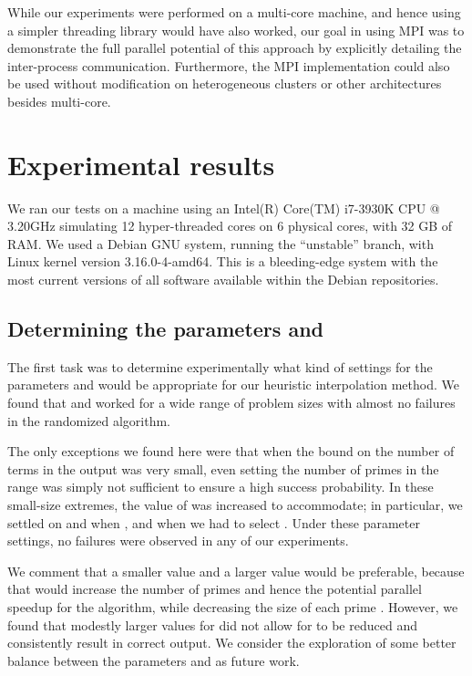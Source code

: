 \documentclass[letterpaper,10pt]{article}
\begin{document}
 While our experiments were performed on a multi-core machine, and hence
 using a simpler threading library would have also worked, our goal in
 using MPI was to demonstrate the full parallel potential of this
 approach by explicitly detailing the inter-process communication.
 Furthermore, the MPI implementation could also be used without
 modification on heterogeneous clusters or other architectures besides
 multi-core.
  
\section{Experimental results}
\label{sec:exper}

We ran our tests on a machine using an Intel(R) Core(TM) i7-3930K CPU @ 3.20GHz 
simulating 12 hyper-threaded cores on 6 physical cores, with 32 GB of RAM. 
We used a Debian GNU system, running the ``unstable'' branch, 
with Linux kernel version 3.16.0-4-amd64. This is a bleeding-edge system
with the most current versions of all software available within the
Debian repositories.

\subsection{Determining the parameters  and }

The first task was to determine experimentally what kind of settings for
the parameters  and  would be appropriate for our heuristic
interpolation method. We found that  and  worked for a
wide range of problem sizes with almost no failures in the randomized
algorithm.

The only exceptions we found here were that when the bound on the number of
terms  in the output was very small, even setting  the number
of primes  in the range  was simply not
sufficient to ensure a high success probability. In these small-size
extremes, the value of  was increased to accommodate; in particular, 
we settled on  and
 when , and when  we had to select 
. Under these parameter settings, no failures were
observed in any of our experiments.

We comment that a smaller  value and a
larger  value would be preferable, because that 
would increase the number of primes  and
hence the potential parallel speedup
for the algorithm, while decreasing the size  of each prime
. However, we found that modestly larger values for  did not
allow for  to be reduced and consistently result in correct output.
We consider the exploration of some better balance between the
parameters  and  as future work.
\end{document}
